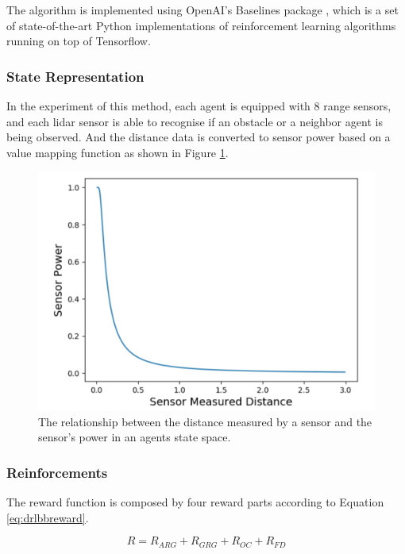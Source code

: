 The algorithm is implemented using OpenAI's Baselines package \cite{dhariwal2017openai}, which is a set of state-of-the-art Python implementations of reinforcement learning algorithms running on top of Tensorflow.

\subsubsection{State Representation}

In the experiment of this method, each agent is equipped with 8 range sensors, and each lidar sensor is able to recognise if an obstacle or a neighbor agent is being observed. 
And the distance data is converted to sensor power based on a value mapping function as shown in Figure \ref{fig:sensorpower}.

\begin{figure}
	\centering
	\includegraphics[width=5in]{sensorpower.png}
	\caption{The relationship between the distance measured by a sensor and the sensor’s power in an agents state space.}
	\label{fig:sensorpower} 
\end{figure}

\subsubsection{Reinforcements}

The reward function is composed by four reward parts according to Equation \ref{eq:drlbbreward}.

\begin{equation}
R=R_{ARG}+R_{GRG}+R_{OC}+R_{FD}
\label{eq:drlbbreward}
\end{equation}

